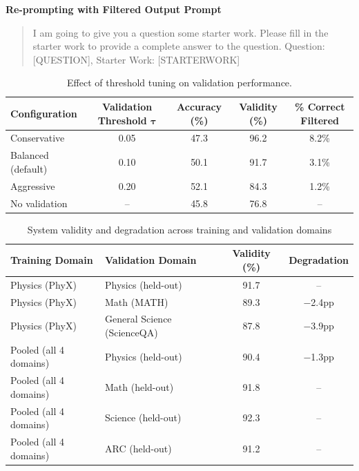 \documentclass{uai2026} %
\theoremstyle{remark}
\theoremstyle{plain}
\theoremstyle{definition}
\begin{document}
\textbf{Re-prompting with Filtered Output Prompt}

\begin{quote}
I am going to give you a question some starter work. Please fill in the starter work to provide a complete answer to the question. Question: [QUESTION], Starter Work: [STARTERWORK]
\end{quote}



\begin{table}[t]
\centering


\caption{Effect of threshold tuning on validation performance.}
\label{tab:threshold tuning}
\begin{tabular}{lcccc}
\toprule
\textbf{Configuration} & \textbf{Validation Threshold} $\boldsymbol{\tau}$ & \textbf{Accuracy (\%)} & \textbf{Validity (\%)} & \textbf{\% Correct Filtered} \\
\midrule
Conservative & 0.05 & 47.3 & 96.2 & 8.2\% \\
Balanced (default) & 0.10 & 50.1 & 91.7 & 3.1\% \\
Aggressive & 0.20 & 52.1 & 84.3 & 1.2\% \\
No validation & -- & 45.8 & 76.8 & -- \\
\bottomrule
\end{tabular}
\end{table}

\begin{table}[t]
\centering


\caption{System validity and degradation across training and validation domains}
\label{tab:across training}
\begin{tabular}{l|l|c|c}
\hline
\textbf{Training Domain} & \textbf{Validation Domain} & \textbf{Validity (\%)} & \textbf{Degradation} \\
\hline
Physics (PhyX) & Physics (held-out) & 91.7 & – \\
Physics (PhyX) & Math (MATH) & 89.3 & −2.4pp \\
Physics (PhyX) & General Science (ScienceQA) & 87.8 & −3.9pp \\
Pooled (all 4 domains) & Physics (held-out) & 90.4 & −1.3pp \\
Pooled (all 4 domains) & Math (held-out) & 91.8 & – \\
Pooled (all 4 domains) & Science (held-out) & 92.3 & – \\
Pooled (all 4 domains) & ARC (held-out) & 91.2 & – \\
\hline
\end{tabular}
\end{table}
\end{document}

